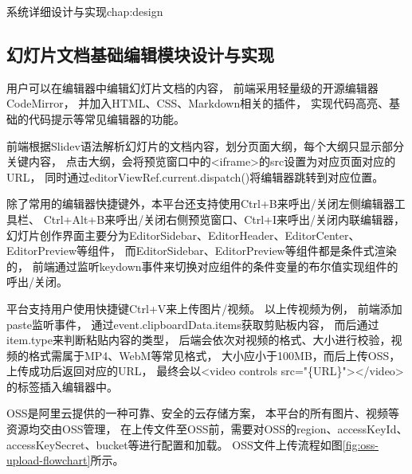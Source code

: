\begin{cuzchapter}{系统详细设计与实现}{chap:design}
        \subsection{幻灯片文档基础编辑模块设计与实现}
    用户可以在编辑器中编辑幻灯片文档的内容，
    前端采用轻量级的开源编辑器CodeMirror，
    并加入HTML、CSS、Markdown相关的插件，
    实现代码高亮、基础的代码提示等常见编辑器的功能。

    前端根据Slidev语法解析幻灯片的文档内容，划分页面大纲，每个大纲只显示部分关键内容，
    点击大纲，会将预览窗口中的<iframe>的src设置为对应页面对应的URL，
    同时通过editorViewRef.current.dispatch()将编辑器跳转到对应位置。
  
    除了常用的编辑器快捷键外，本平台还支持使用Ctrl+B来呼出/关闭左侧编辑器工具栏、
    Ctrl+Alt+B来呼出/关闭右侧预览窗口、Ctrl+I来呼出/关闭内联编辑器，
    幻灯片创作界面主要分为EditorSidebar、EditorHeader、EditorCenter、EditorPreview等组件，
    而EditorSidebar、EditorPreview等组件都是条件式渲染的，
    前端通过监听keydown事件来切换对应组件的条件变量的布尔值实现组件的呼出/关闭。
  
    

    平台支持用户使用快捷键Ctrl+V来上传图片/视频。
    以上传视频为例，
    前端添加paste监听事件，
    通过event.clipboardData.items获取剪贴板内容，
    而后通过item.type来判断粘贴内容的类型，
    后端会依次对视频的格式、大小进行校验，视频的格式需属于MP4、WebM等常见格式，
    大小应小于100MB，而后上传OSS，
    上传成功后返回对应的URL，
    最终会以<video controls src="\{URL\}"></video>的标签插入编辑器中。

    OSS是阿里云提供的一种可靠、安全的云存储方案，
    本平台的所有图片、视频等资源均交由OSS管理，
    在上传文件至OSS前，需要对OSS的region、accessKeyId、accessKeySecret、bucket等进行配置和加载。
    OSS文件上传流程如图\ref{fig:oss-upload-flowchart}所示。


\end{cuzchapter}
